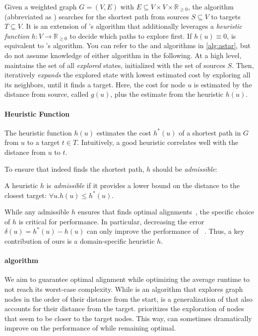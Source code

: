 Given a weighted graph $G=(V,E)$ with $E \subseteq V \times V \times
\mathbb{R}_{\geq 0}$, the \A algorithm (abbreviated as \A) searches for the
shortest path from sources $S \subseteq V$ to targets $T \subseteq V$. It is an
extension of \dijkstra's algorithm that additionally leverages a \emph{heuristic
function} $h \colon V \to \mathbb{R}_{\geq 0}$ to decide which paths to explore
first.
%
If $h(u) \equiv 0$, \A is equivalent to \dijkstra's algorithm.
%
You can refer to the \A and \dijkstra algorithms in \cref{alg:astar}, but do not
assume knowledge of either algorithm in the following.
%
At a high level, \A maintains the set of all \emph{explored} states, initialized
with the set of sources $S$. Then, \A iteratively \emph{expands} the explored
state with lowest estimated cost by exploring all its neighbors, until it finds
a target. Here, the cost for node $u$ is estimated by the distance from source, called $g(u)$, plus the estimate from the heuristic $h(u)$.

\paragraph{Heuristic Function}
The heuristic function $h(u)$ estimates the
cost $h^*(u)$ of a shortest path in $G$ from $u$ to a target $t \in T$. Intuitively, a
good heuristic correlates well with the distance from $u$ to $t$.

To ensure that \A indeed finds the shortest path, $h$ should be
\emph{admissible}:

\begin{definition} A heuristic $h$ is \emph{admissible}
    if it provides a lower bound on the distance to the closest target: $\forall
    u. h(u) \leq h^*(u)$.
\end{definition}

While any admissible $h$ ensures that \A finds optimal
alignments~\cite{dechter_generalized_1985}, the specific choice of $h$
is critical for performance. In particular, decreasing the error $\delta(u) =
h^*(u)-h(u)$ can only improve the performance of
\A~\cite{dechter_generalized_1985}. Thus, a key contribution of ours is
a domain-specific heuristic $h$.


\paragraph{\A algorithm}
We aim to guarantee optimal alignment while optimizing the average runtime
to not reach its worst-case complexity. While \dijkstra is an algorithm that
explores graph nodes in the order of their distance from the start, \A is a
generalization of \dijkstra that also accounts for their distance from the
target. \A prioritizes the exploration of nodes that seem to be closer to the
target nodes. This way, \A can sometimes dramatically improve on the performance
of \dijkstra while remaining optimal.

